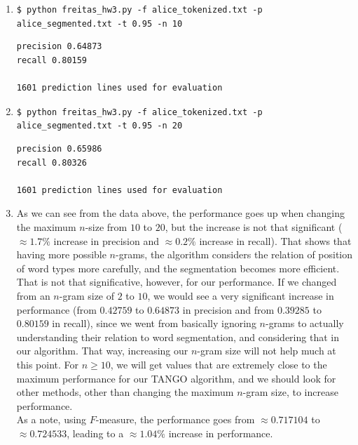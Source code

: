 \documentclass[112pt]{article}
\begin{document}
\begin{enumerate}
\item
\texttt{\$ python freitas\_hw3.py -f alice\_tokenized.txt -p alice\_segmented.txt -t 0.95 -n 10}

\begin{verbatim}
precision 0.64873
recall 0.80159

1601 prediction lines used for evaluation
\end{verbatim}

\item
\texttt{\$ python freitas\_hw3.py -f alice\_tokenized.txt -p alice\_segmented.txt -t 0.95 -n 20}

\begin{verbatim}
precision 0.65986
recall 0.80326

1601 prediction lines used for evaluation
\end{verbatim}
\item
As we can see from the data above, the performance goes up when changing the maximum $n$-size from $10$ to $20$, but the increase is not that significant ($\approx 1.7\%$ increase in precision and $\approx 0.2\%$ increase in recall). That shows that having more possible $n$-grams, the algorithm considers the relation of position of word types more carefully, and the segmentation becomes more efficient.\\

That is not that significative, however, for our performance. If we changed from an $n$-gram size of $2$ to $10$, we would see a very significant increase in performance (from $0.42759$ to $0.64873$ in precision and from $0.39285$ to $0.80159$ in recall), since we went from basically ignoring $n$-grams to actually understanding their relation to word segmentation, and considering that in our algorithm. That way, increasing our $n$-gram size will not help much at this point. For $n \ge 10$, we will get values that are extremely close to the maximum performance for our TANGO algorithm, and we should look for other methods, other than changing the maximum $n$-gram size, to increase performance.\\

As a note, using $F$-measure, the performance goes from $\approx 0.717104$ to $\approx 0.724533$, leading to a $\approx 1.04\%$ increase in performance.
\end{enumerate}
\newpage
\end{document}
